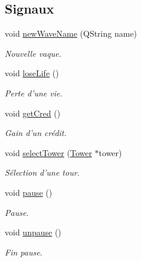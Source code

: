 \subsection*{Signaux}
\begin{DoxyCompactItemize}
\item 
void \hyperlink{classRender_a916c15ab4b31cc0f34d9d53b89b89ac0}{newWaveName} (QString name)
\begin{DoxyCompactList}\small\item\em Nouvelle vaque. \end{DoxyCompactList}\item 
void \hyperlink{classRender_ad88f7f01a7b9fafa756221707d590a78}{loseLife} ()
\begin{DoxyCompactList}\small\item\em Perte d'une vie. \end{DoxyCompactList}\item 
void \hyperlink{classRender_acd71f1c6c9d67dff3627da4ff6a4c9b8}{getCred} ()
\begin{DoxyCompactList}\small\item\em Gain d'un crédit. \end{DoxyCompactList}\item 
void \hyperlink{classRender_a126c4b49e93103a751f66359d8e63171}{selectTower} (\hyperlink{classTower}{Tower} $\ast$tower)
\begin{DoxyCompactList}\small\item\em Sélection d'une tour. \end{DoxyCompactList}\item 
void \hyperlink{classRender_abb5d0f66b85c255f756aced453b00b5b}{pause} ()
\begin{DoxyCompactList}\small\item\em Pause. \end{DoxyCompactList}\item 
void \hyperlink{classRender_acc15883381c82b6bb4b0d858260ecdff}{unpause} ()
\begin{DoxyCompactList}\small\item\em Fin pause. \end{DoxyCompactList}\end{DoxyCompactItemize}
